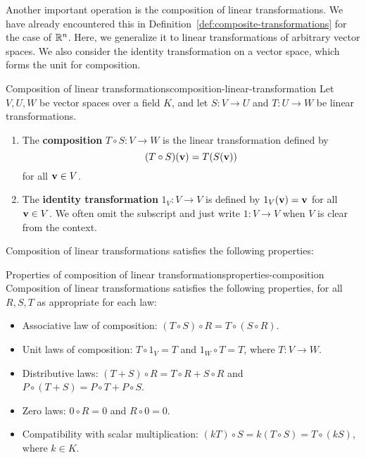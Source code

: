 Another important operation is the composition of linear
transformations. We have already encountered this in
Definition~\ref{def:composite-transformations} for the case of
$\mathbb{R}^n$. Here, we generalize it to linear transformations of arbitrary
vector spaces.  We also consider the identity transformation on a
vector space, which forms the unit for composition.

\begin{definition}{Composition of linear transformations}{composition-linear-transformation}
  Let $V,U,W$ be vector spaces over a field $K$, and let $S:V\to U$
  and $T:U\to W$ be linear transformations.
  \begin{enumialphparenastyle}
    \begin{enumerate}
    \item The
      \textbf{composition}%
       $T\circ S:V\to W$ is
      the linear transformation defined by
      \begin{equation*}
        (T\circ S) (\vect{v}) = T(S(\vect{v}))
      \end{equation*}
      for all $\vect{v}\in V$.
    \item The \textbf{identity transformation}%
      $1_V:V\to V$ is defined by $1_V(\vect{v})=\vect{v}$ for all
      $\vect{v}\in V$. We often omit the subscript and just write
      $1:V\to V$ when $V$ is clear from the context.
    \end{enumerate}
  \end{enumialphparenastyle}
\end{definition}

Composition of linear transformations satisfies the following properties:

\begin{proposition}{Properties of composition of linear transformations}{properties-composition}
  Composition of linear transformations satisfies the following
  properties, for all $R,S,T$ as appropriate for each law:%
  \begin{itemize}\setlength\itemsep{0em}
  \item Associative law of composition:
    $(T\circ S)\circ R = T\circ (S\circ R)$.
  \item Unit laws of composition: $T\circ 1_V = T$ and $1_W\circ T = T$, where
    $T:V\to W$.
  \item Distributive laws: $(T+S)\circ R = T\circ R + S\circ R$ and
    $P\circ (T+S) = P\circ T + P\circ S$.
  \item Zero laws: $0\circ R = 0$ and $R\circ 0 = 0$.
  \item Compatibility with scalar multiplication:
    $(kT)\circ S = k(T\circ S) = T\circ (kS)$, where $k\in K$.
  \end{itemize}
\end{proposition}

